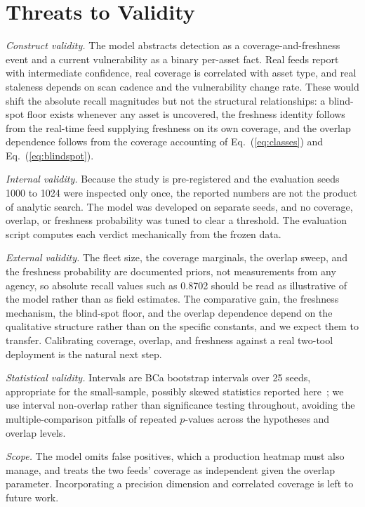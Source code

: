 \documentclass[journal]{IEEEtran}
\begin{document}
\section{Threats to Validity}
\emph{Construct validity.} The model abstracts detection as a coverage-and-freshness event and a
current vulnerability as a binary per-asset fact. Real feeds report with intermediate confidence,
real coverage is correlated with asset type, and real staleness depends on scan cadence and the
vulnerability change rate. These would shift the absolute recall magnitudes but not the structural
relationships: a blind-spot floor exists whenever any asset is uncovered, the freshness identity
follows from the real-time feed supplying freshness on its own coverage, and the overlap dependence
follows from the coverage accounting of Eq.~(\ref{eq:classes}) and Eq.~(\ref{eq:blindspot}).

\emph{Internal validity.} Because the study is pre-registered and the evaluation seeds 1000 to 1024
were inspected only once, the reported numbers are not the product of analytic search. The model was
developed on separate seeds, and no coverage, overlap, or freshness probability was tuned to clear a
threshold. The evaluation script computes each verdict mechanically from the frozen data.

\emph{External validity.} The fleet size, the coverage marginals, the overlap sweep, and the
freshness probability are documented priors, not measurements from any agency, so absolute recall
values such as 0.8702 should be read as illustrative of the model rather than as field estimates.
The comparative gain, the freshness mechanism, the blind-spot floor, and the overlap dependence
depend on the qualitative structure rather than on the specific constants, and we expect them to
transfer. Calibrating coverage, overlap, and freshness against a real two-tool deployment is the
natural next step.

\emph{Statistical validity.} Intervals are BCa bootstrap intervals over 25 seeds, appropriate for
the small-sample, possibly skewed statistics reported here~\cite{efron1987bca,efron1994introduction};
we use interval non-overlap rather than significance testing throughout, avoiding the
multiple-comparison pitfalls of repeated $p$-values across the hypotheses and overlap levels.

\emph{Scope.} The model omits false positives, which a production heatmap must also manage, and
treats the two feeds' coverage as independent given the overlap parameter. Incorporating a
precision dimension and correlated coverage is left to future work.
\end{document}
